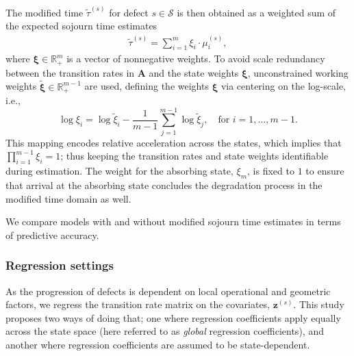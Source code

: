 \documentclass{article}
\begin{document}
The modified time $\widetilde{\tau}^{(s)}$ for defect $s \in \mathcal S$ is then obtained as a weighted sum of the expected sojourn time estimates
\begin{align}
\widetilde\tau^{(s)}= \sum_{i = 1}^m \xi_i  \cdot \mu_i^{(s)}, \label{eq:warped_time}
\end{align}
where $\bm{\xi} \in \mathbb{R}_+^m$ is a vector of nonnegative weights. 
To avoid scale redundancy between the transition rates in $\bm A$ and the state weights $\bm\xi$, unconstrained working weights $\widetilde{\bm\xi}\in\mathbb{R}_+^{m-1}$ are used, defining the weights $\bm\xi$ via centering on the log-scale, i.e.,
$$
 \log \xi_i = \log\widetilde{\xi}_i - \frac{1}{m-1}\sum_{j=1}^{m-1}\log\widetilde{\xi}_j, \quad \text{for } i = 1, \dots, m-1.
$$
This mapping encodes relative acceleration across the states, which implies that $\prod_{i = 1}^{m-1} \xi_i = 1$; thus keeping the transition rates and state weights identifiable during estimation.
The weight for the absorbing state, $\xi_m$, is fixed to $1$ to ensure that arrival at the absorbing state concludes the degradation process in the modified time domain as well.

We compare models with and without modified sojourn time estimates in terms of predictive accuracy. 







\subsubsection{Regression settings} \label{sec:regression} \label{sec:regression_state_dependent}
As the progression of defects is dependent on local operational and geometric factors, we regress the transition rate matrix on the covariates, $\bm{z}^{(s)}$. This study proposes two ways of doing that; one where regression coefficients apply equally across the state space (here referred to as \textit{global} regression coefficients), and another where regression coefficients are assumed to be state-dependent.
\end{document}
